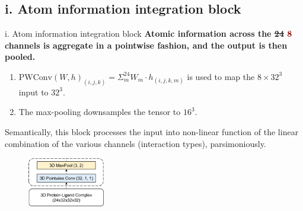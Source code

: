 \documentclass[aspectratio=169,xcolor=dvipsnames]{beamer}
\begin{document}
\subsection{i. Atom information integration block}
\begin{frame}{i. Atom information integration block}
    \textbf{Atomic information across the \sout{24} 
    \textcolor{darkred}{8} channels is aggregate in a 
    pointwise fashion, and the output is then pooled.}
    \begin{enumerate}
        \item $\text{PWConv}(W, h)_{(i, j, k)} = \Sigma_{m}^{24}W_m\cdot 
        h_{(i,j,k,m)}$ is used to map the $8\times32^3$ input to $32^3$.
        \item The max-pooling downsamples the tensor to $16^3$.
    \end{enumerate}
    Semantically, this block processes the input into non-linear function of the linear combination of the various channels (interaction types), parsimoniously.
    \begin{figure}
        \centering
        \includegraphics[width=0.3\textwidth]{images/aii_block}
    \end{figure}
\end{frame}
\end{document}
